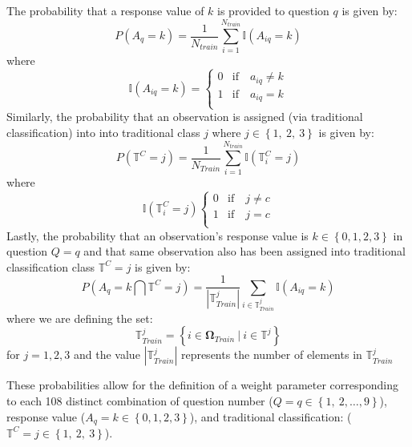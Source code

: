 \documentclass[12pt,]{article}
\begin{document}
The probability that a response value of \(k\) is provided to question
\(q\) is given by:
\[P\left(A_{q}=k \right) = \frac{1}{N_{train}} \sum_{i=1}^{N_{train}} \mathbb{I}\left(A_{iq}=k \right)\]
where \[\mathbb{I}\left(A_{iq} = k \right)=
      \begin{cases}
        0 &\mbox{if} \quad  a_{iq} \neq k \\
        1 &\mbox{if} \quad  a_{iq}=k \\  
      \end{cases}
      \] Similarly, the probability that an observation is assigned (via
traditional classification) into into traditional class \(j\) where
\(j \in \left \{ 1, \ 2, \ 3 \right \}\) is given by:
\[P\left( \mathbb{T}^{C}=j \right) = \frac{1}{N_{Train}} \sum_{i=1}^{N_{train}} \mathbb{I}\left(\mathbb{T}_{i}^{C}=j \right)\]
where \[\mathbb{I}\left(\mathbb{T}_{i}^{C}=j \right)
      \begin{cases}
        0 &\mbox{if} \quad  j \neq c \\
        1 &\mbox{if} \quad  j = c \\  
      \end{cases}
      \] Lastly, the probability that an observation's response value is
\(k \in \left \{ 0, 1, 2, 3 \right \}\) in question \(Q=q\) and that
same observation also has been assigned into traditional classification
class \(\mathbb{T}^{C}=j\) is given by:
\[P\left(A_{q} = k \bigcap \mathbb{T}^{C}=j   \right) =  \frac{1}{|\mathbb{T}_{Train}^{j}|} \sum_{i \in \mathbb{T}_{Train}^{j}} \mathbb{I} \left(A_{iq}=k \right) \]
where we are defining the set:
\[\mathbb{T}_{Train}^{j}= \left \{  i \in \mathbf{\Omega}_{Train} \ \Big | \ i \in \mathbb{T}^{j} \right \}\]
for \(j=1,2,3\) and the value \(|\mathbb{T}_{Train}^{j}|\) represents
the number of elements in \(\mathbb{T}_{Train}^{j}\)

These probabilities allow for the definition of a weight parameter
corresponding to each 108 distinct combination of question number
(\(Q=q \in \left \{ 1, \ 2, \ldots, 9 \right \}\)), response value
(\(A_{q} = k \in \left \{ 0, 1, 2, 3 \right \}\)), and traditional
classification:
(\(\mathbb{T}^{C} = j \in \left \{ 1, \ 2 , \ 3 \right \}\)).
\end{document}
